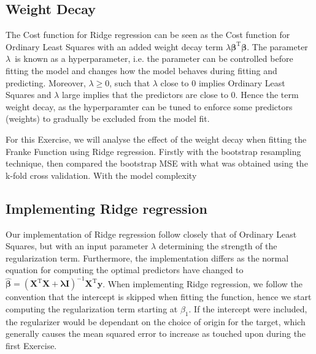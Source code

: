 \documentclass[11pt, a4paper]{article}
\begin{document}
\subsection*{Weight Decay}
The Cost function for Ridge regression can be seen as the Cost function for Ordinary Least Squares with an added weight decay term $\lambda\bm{\beta}^\text{T}\bm{\beta}$. The parameter $\lambda$ is known as a hyperparameter, i.e. the parameter can be controlled before fitting the model and changes how the model behaves during fitting and predicting. \cite{Goodfellow2016} Moreover, $\lambda \geq 0$, such that $\lambda$ close to $0$ implies Ordinary Least Squares and $\lambda$ large implies that the predictors are close to $0$. Hence the term weight decay, as the hyperparamter can be tuned to enforce some predictors (weights) to gradually be excluded from the model fit.

For this Exercise, we will analyse the effect of the weight decay when fitting the Franke Function using Ridge regression. Firstly with the bootstrap resampling technique, then compared the bootstrap MSE with what was obtained using the k-fold cross validation. With the model complexity

\subsection*{Implementing Ridge regression}
Our implementation of Ridge regression follow closely that of Ordinary Least Squares, but with an input parameter $\lambda$ determining the strength of the regularization term. Furthermore, the implementation differs as the normal equation for computing the optimal predictors have changed to $\bm{\hat{\beta}} = \left(\bm{X}^\text{T}\bm{X} + \bm{\lambda}\bm{I}\right)^{-1}\bm{X}^\text{T}\bm{y}$. When implementing Ridge regression, we follow the convention that the intercept is skipped when fitting the function, hence we start computing the regularization term starting at $\beta_1$. \cite{Geron2019} If the intercept were included, the regularizer would be dependant on the choice of origin for the target, which generally causes the mean squared error to increase as touched upon during the first Exercise.
\end{document}
